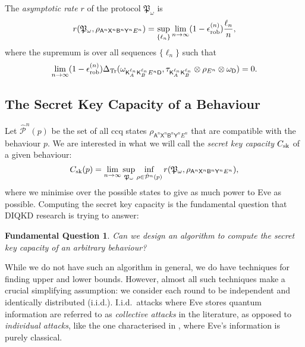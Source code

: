 \documentclass[10pt, a4paper]{article}
\numberwithin{equation}{section} %
\theoremstyle{definition}
\theoremstyle{plain}
\newtheorem{funqn}{Fundamental Question}
\newcommand{\?}{\mathrel{?}} %
\newcommand{\Tr}{\mathrm{Tr}} %
\newcommand{\crv}[1]{\mathsf{#1}}
\newcommand{\rob}{\rm rob}
\newcommand{\erob}[1]{\epsilon_{\rob}^{(#1)}}
\newcommand{\compatstates}[2][]{\hat{\mathcal{P}}#1(#2)}
\newcommand{\sk}{\rm sk}
\begin{document}
    The \emph{asymptotic rate} \(r\) of the protocol \(\mathfrak{P}_{\omega}\) is~\cite{CQKeyDistill}
    \begin{equation}
      r(\mathfrak{P}_{\omega}, \rho_{\crv{A}^n\crv{X}^n \crv{B}^n\crv{Y}^n E^n}) = \sup_{\{\ell_n\}} \lim_{n\to\infty} (1-\erob{n}) \frac{\ell_n}{n},
    \end{equation}
    where the supremum is over all sequences \(\{\ell_n\}\) such that
    \begin{equation}
    \lim_{n\to\infty} (1-\erob{n})\Delta_{\Tr}(\omega_{\crv{K}_{A}^{\ell_n} \crv{K}_{B}^{\ell_n} E^n \crv{D}}, \tau_{\crv{K}_{A}^{\ell_n} \crv{K}_{B}^{\ell_n}} \otimes \rho_{E^n} \otimes \omega_{\crv{D}}) = 0.
    \end{equation}

    \subsection{The Secret Key Capacity of a Behaviour}

    Let \(\compatstates[^n]{p}\) be the set of all ccq states \(\rho_{\crv{A}^n\crv{X}^n \crv{B}^n\crv{Y}^n E^n}\) that are compatible with the behaviour \(p\). We are interested in what we will call the \emph{secret key capacity} \(C_{\sk}\) of a given behaviour:
    \begin{equation}\label{eqn:seckeycapbehav}
      C_{\sk}(p) = \lim_{n\to\infty} \sup_{\mathfrak{P}_{\omega}} \inf_{\rho \in \compatstates[^n]{p}} r(\mathfrak{P}_{\omega}, \rho_{\crv{A}^n\crv{X}^n \crv{B}^n\crv{Y}^n E^n}),
    \end{equation}
    where we minimise over the possible states to give as much power to Eve as possible. Computing the secret key capacity is the fundamental question that DIQKD research is trying to answer:
    \begin{funqn}\label{fqn:cap}
      Can we design an algorithm to compute the secret key capacity of an arbitrary behaviour?
    \end{funqn}

    While we do not have such an algorithm in general, we do have techniques for finding upper and lower bounds. However, almost all such techniques make a crucial simplifying assumption: we consider each round to be independent and identically distributed (i.i.d.). I.i.d.\ attacks where Eve stores quantum information are referred to as \emph{collective attacks} in the literature, as opposed to \emph{individual attacks}, like the one characterised in , where Eve's information is purely classical.
\end{document}
